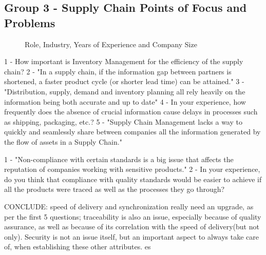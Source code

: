 \subsection{Group 3 - Supply Chain Points of Focus and Problems}


\begin{figure}[ht]



      \caption{Role, Industry, Years of Experience and Company Size}
    \label{fig:group1_graphics}
\end{figure}

1 - How important is Inventory Management for the efficiency of the supply chain?
2 - "In a supply chain, if the information gap between partners is shortened, a faster product cycle (or shorter lead time) can be attained."
3 - "Distribution, supply, demand and inventory planning all rely heavily on the information being both accurate and up to date"
4 - In your experience, how frequently does the absence of crucial information cause delays in processes such as shipping, packaging, etc.?
5 - "Supply Chain Management lacks a way to quickly and seamlessly share between companies all the information generated by the flow of assets in a Supply Chain."


1 - "Non-compliance with certain standards is a big issue that affects the reputation of companies working with sensitive products."
2 - In your experience, do you think that compliance with quality standards would be easier to achieve if all the products were traced as well as the processes they go through?


CONCLUDE: speed of delivery and synchronization really need an upgrade, as per the first 5 questions; traceability is also an issue, especially because of quality assurance, as well as because of its correlation with the speed of delivery(but not only). Security is not an issue itself, but an important aspect to always take care of, when establishing these other attributes. es